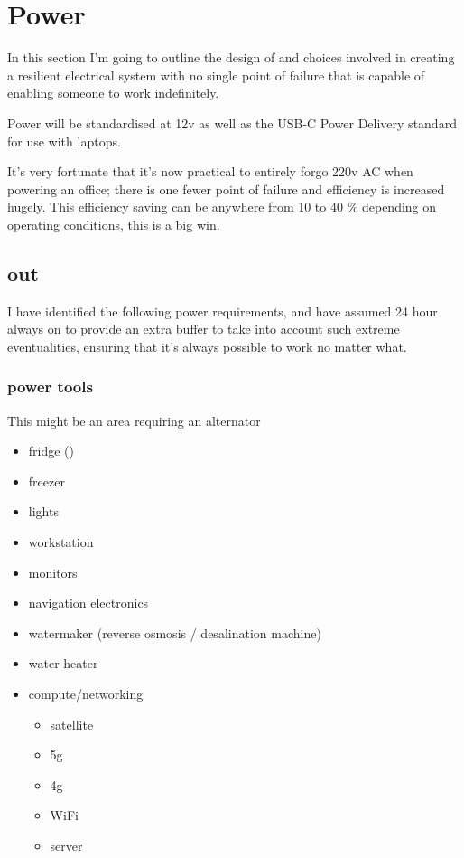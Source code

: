 \section{Power}

In this section I'm going to outline the design of and choices involved in creating a resilient electrical system with no single point of failure that is capable of enabling someone to work indefinitely.

Power will be standardised at 12v as well as the USB-C Power Delivery standard for use with laptops.

It's very fortunate that it's now practical to entirely forgo 220v AC when powering an office; there is one fewer point of failure and efficiency is increased hugely. This efficiency saving can be anywhere from 10 to 40 \% depending on operating conditions, this is a big win.

\subsection{out}
I have identified the following power requirements, and have assumed 24 hour always on to provide an extra buffer to take into account such extreme eventualities, ensuring that it's always possible to work no matter what.

\subsubsection{power tools}
This might be an area requiring an alternator

\begin{itemize}
    \item fridge ()
    \item freezer
    \item lights
    \item workstation
    \item monitors
    \item navigation electronics
    \item watermaker (reverse osmosis / desalination machine)
    \item water heater
    \item compute/networking
    \begin{itemize}
        \item satellite
        \item 5g
        \item 4g
        \item WiFi
        \item server
    \end{itemize}
\end{itemize}

